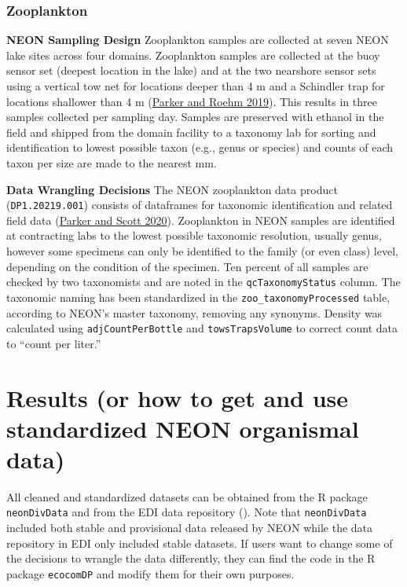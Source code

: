 \documentclass[
  12pt,
]{article}
\begin{document}
\hypertarget{zooplankton}{%
\subsubsection{Zooplankton}\label{zooplankton}}

\textbf{NEON Sampling Design} Zooplankton samples are collected at seven NEON lake sites across four domains. Zooplankton samples are collected at the buoy sensor set (deepest location in the lake) and at the two nearshore sensor sets using a vertical tow net for locations deeper than 4 m and a Schindler trap for locations shallower than 4 m (\protect\hyperlink{ref-ParkerRoehm2019}{Parker and Roehm 2019}). This results in three samples collected per sampling day. Samples are preserved with ethanol in the field and shipped from the domain facility to a taxonomy lab for sorting and identification to lowest possible taxon (e.g., genus or species) and counts of each taxon per size are made to the nearest mm.

\textbf{Data Wrangling Decisions} The NEON zooplankton data product (\texttt{DP1.20219.001}) consists of dataframes for taxonomic identification and related field data (\protect\hyperlink{ref-ParkerScott2020}{Parker and Scott 2020}). Zooplankton in NEON samples are identified at contracting labs to the lowest possible taxonomic resolution, usually genus, however some specimens can only be identified to the family (or even class) level, depending on the condition of the specimen. Ten percent of all samples are checked by two taxonomists and are noted in the \texttt{qcTaxonomyStatus} column. The taxonomic naming has been standardized in the \texttt{zoo\_taxonomyProcessed} table, according to NEON's master taxonomy, removing any synonyms. Density was calculated using \texttt{adjCountPerBottle} and \texttt{towsTrapsVolume} to correct count data to ``count per liter.''

\hypertarget{results-or-how-to-get-and-use-standardized-neon-organismal-data}{%
\section{Results (or how to get and use standardized NEON organismal data)}\label{results-or-how-to-get-and-use-standardized-neon-organismal-data}}

All cleaned and standardized datasets can be obtained from the R package \texttt{neonDivData} and from the EDI data repository (). Note that \texttt{neonDivData} included both stable and provisional data released by NEON while the data repository in EDI only included stable datasets. If users want to change some of the decisions to wrangle the data differently, they can find the code in the R package \texttt{ecocomDP} and modify them for their own purposes.
\end{document}
